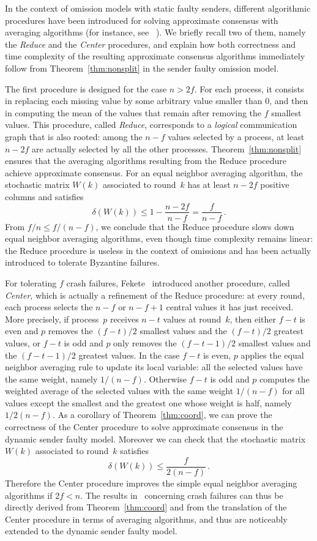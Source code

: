 \documentclass[a4paper]{article}
\theoremstyle{newthm}
\renewcommand{\leq}{\leqslant}
\begin{document}
In the context of omission models with static faulty senders, different algorithmic procedures have been introduced 
	for solving approximate consensus with averaging algorithms (for instance, see ~\cite{DLPSW86,Fek90}).
We briefly recall two of them, namely the {\em  Reduce} and the {\em Center} procedures, and explain 
	how both correctness  and time complexity of the resulting
	approximate consensus algorithms immediately follow from Theorem~\ref{thm:nonsplit}
	 in the sender faulty omission model.

The first procedure is designed for the case $n>2f$.
For each process, it consists in replacing each missing value by 
	some arbitrary value smaller than 0, and then in computing the mean of the values 
	that remain  after removing the $f$ smallest values.
This procedure, called {\em Reduce}, corresponds to a {\em logical} communication graph
	that is also rooted: among the $n-f$ values selected by a process,
	at least $n-2f$ are actually selected by all the other processes.
Theorem~\ref{thm:nonsplit} ensures that the  averaging algorithms resulting from the Reduce procedure
	achieve approximate consensus.
For an equal neighbor averaging algorithm, the stochastic matrix $W(k)$ associated to round~$k$ 
	has at least $n-2f$ positive columns and satisfies 
	$$  \delta(W(k)) \leq  1-\frac{n-2f}{n-f} = \frac{f}{n-f}  \, .$$ 
From  $ f/n  \leq  f/( n-f ) $, we conclude that the Reduce procedure  slows down 
	equal neighbor averaging algorithms, even though time complexity remains linear:
	the Reduce procedure is useless in the context of omissions and has been actually  introduced to 
	tolerate Byzantine failures.
	
For tolerating $f$ crash failures, Fekete~\cite{Fek90} introduced another procedure, called {\em Center}, which 
	is actually a refinement of the Reduce procedure:  at every round, each process selects
	 the $n-f$ or $n-f+1$ central values it has just received.
More precisely, if process~$p$ receives $n-t$ values at round~$k$, then either $f-t$ is even and $p$ 
	removes  the $(f-t)/2$ smallest values and the $(f-t)/2$ greatest values, or 
	$f-t$ is odd and $p$  only removes the $(f-t-1)/2$ smallest values and the $(f-t -1)/2$ greatest values.
In the case $f-t$ is even, $p$ applies the equal neighbor averaging rule to update its local variable:
	all the selected values have the same weight, namely   $1/(n-f)$.
Otherwise $f-t$ is odd and $p$ computes the weighted average of the selected values with
	the same weight  $1/(n-f)$ for all values except the 
	smallest and the greatest one whose weight is half, namely $1/2(n-f)$.
As a corollary of Theorem~\ref{thm:coord}, we can prove the correctness of the Center procedure to solve
	approximate consensus in the dynamic sender faulty model.
Moreover we can check that the  stochastic matrix $W(k)$ associated to round~$k$  satisfies 
	$$  \delta \left( W(k) \right) \leq  \frac{f}{2(n-f)}  \, .$$
Therefore the Center procedure improves the simple equal neighbor averaging algorithms if $2f <n$.  
The results in~\cite{Fek90} concerning crash failures can thus be directly derived from
	Theorem~\ref{thm:coord} and  from the translation of the Center procedure in terms of averaging 
	algorithms, and thus are noticeably extended to the dynamic sender faulty model.
\end{document}

